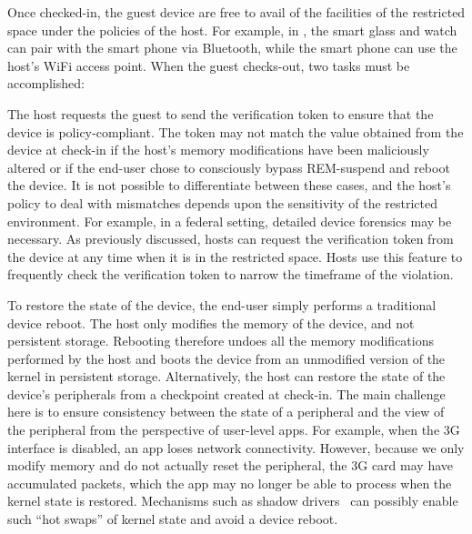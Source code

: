  Once checked-in, the guest device are free to avail of
the facilities of the restricted space under the policies of the host. For
example, in , the smart glass and watch can
pair with the smart phone via Bluetooth, while the smart phone can use the
host's WiFi access point. When the guest checks-out, two tasks must be
accomplished:
%
\begin{mylist}
%
\item {} The host requests the guest to send
the verification token to ensure that the device is policy-compliant. The token
may not match the value obtained from the device at check-in if the host's
memory modifications have been maliciously altered or if the end-user chose to
consciously bypass REM-suspend and reboot the device.  It is not possible to
differentiate between these cases, and the host's policy to deal with
mismatches depends upon the sensitivity of the restricted environment. For
example, in a federal setting, detailed device forensics may be necessary. As
previously discussed, hosts can request the verification token from the device
at any time when it is in the restricted space. Hosts use this feature to
frequently check the verification token to narrow the timeframe of the
violation.

\item {} To restore the state of the device, the
end-user simply performs a traditional device reboot. The host only modifies
the memory of the device, and not persistent storage. Rebooting therefore
undoes all the memory modifications performed by the host and boots the device
from an unmodified version of the kernel in persistent storage. Alternatively,
the host can restore the state of the device's peripherals from a checkpoint
created at check-in. The main challenge here is to ensure consistency between
the state of a peripheral and the view of the peripheral from the perspective
of user-level apps. For example, when the 3G interface is disabled, an app
loses network connectivity. However, because we only modify memory and do not
actually reset the peripheral, the 3G card may have accumulated packets, which
the app may no longer be able to process when the kernel state is restored.
Mechanisms such as shadow drivers~\cite{shadow:tocs06} can possibly enable 
such ``hot swaps'' of kernel state and avoid a device reboot.
%
\end{mylist}


